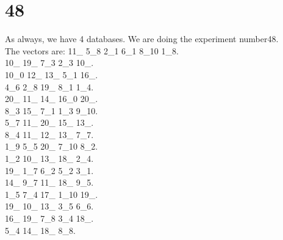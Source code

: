 \chapter{48}
\indent As always, we have 4 databases. We are doing the experiment number48.\\
The vectors are:
11\_ 5\_8 2\_1 6\_1 8\_10 1\_8.\\10\_ 19\_ 7\_3 2\_3 10\_.\\10\_0 12\_ 13\_ 5\_1 16\_.\\4\_6 2\_8 19\_ 8\_1 1\_4.\\20\_ 11\_ 14\_ 16\_0 20\_.\\8\_3 15\_ 7\_1 1\_3 9\_10.\\5\_7 11\_ 20\_ 15\_ 13\_.\\8\_4 11\_ 12\_ 13\_ 7\_7.\\1\_9 5\_5 20\_ 7\_10 8\_2.\\1\_2 10\_ 13\_ 18\_ 2\_4.\\19\_ 1\_7 6\_2 5\_2 3\_1.\\14\_ 9\_7 11\_ 18\_ 9\_5.\\1\_5 7\_4 17\_ 1\_10 19\_.\\19\_ 10\_ 13\_ 3\_5 6\_6.\\16\_ 19\_ 7\_8 3\_4 18\_.\\5\_4 14\_ 18\_ 8\_8.\\